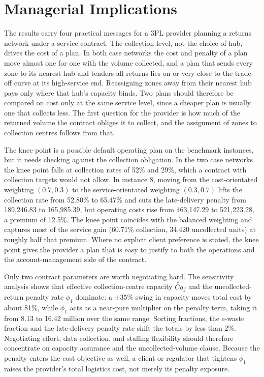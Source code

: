 \documentclass[11pt, a4paper]{article}
\begin{document}
\section{Managerial Implications}
The results carry four practical messages for a 3PL provider planning a returns network under a service contract. The collection level, not the choice of hub, drives the cost of a plan. In both case networks the cost and penalty of a plan move almost one for one with the volume collected, and a plan that sends every zone to its nearest hub and tenders all returns lies on or very close to the trade-off curve at its high-service end. Reassigning zones away from their nearest hub pays only where that hub's capacity binds. Two plans should therefore be compared on cost only at the same service level, since a cheaper plan is usually one that collects less. The first question for the provider is how much of the returned volume the contract obliges it to collect, and the assignment of zones to collection centres follows from that.

The knee point is a possible default operating plan on the benchmark instances, but it needs checking against the collection obligation. In the two case networks the knee point falls at collection rates of 52\% and 29\%, which a contract with collection targets would not allow. In instance 8, moving from the cost-orientated weighting $(0.7,0.3)$ to the service-orientated weighting $(0.3,0.7)$ lifts the collection rate from 52.80\% to 65.47\% and cuts the late-delivery penalty from 189{,}246.83 to 165{,}985.39, but operating costs rise from 463{,}147.29 to 521{,}223.28, a premium of 12.5\%. The knee point coincides with the balanced weighting
and captures most of the service gain (60.71\% collection, 34{,}420 uncollected units) at roughly half that premium. Where no explicit client preference is stated, the knee point gives the provider a plan that is easy to justify to both the operations and the account-management side of the contract.

Only two contract parameters are worth negotiating hard. The sensitivity analysis shows that effective collection-centre capacity $\widetilde{Ca}_j$ and the uncollected-return penalty rate $\phi_1$ dominate: a $\pm 35\%$ swing in capacity moves total cost by about 81\%, while $\phi_1$ acts as a near-pure multiplier on the penalty
term, taking it from 8.13 to 16.42 million over the same range. Sorting fractions, the e-waste fraction and the late-delivery penalty rate shift the totals by less than 2\%. Negotiating effort, data collection, and staffing flexibility should therefore concentrate on capacity assurance and the uncollected-volume clause. Because the penalty enters the cost objective as well, a client or regulator that tightens $\phi_1$ raises the
provider's total logistics cost, not merely its penalty exposure.
\end{document}
